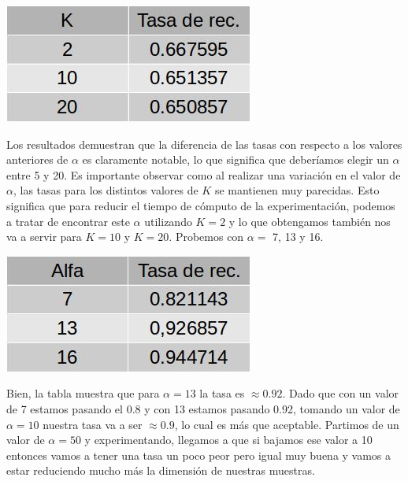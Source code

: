 \newline
\newline
\centerline{
\includegraphics[scale=0.4]{Tablas/alfa5.jpg}
}
\newline
\newline
Los resultados demuestran que la diferencia de las tasas con respecto a los valores anteriores de $\alpha$ es claramente notable, lo que significa que deberíamos elegir un $\alpha$ entre 5 y 20. Es importante observar como al realizar una variación en el valor de $\alpha$, las tasas para los distintos valores de $K$ se mantienen muy parecidas. Esto significa que para reducir el tiempo de cómputo de la experimentación, podemos a tratar de encontrar este $\alpha$ utilizando $K = 2$ y lo que obtengamos también nos va a servir para $K = 10$ y $K = 20$. Probemos con $\alpha = $ 7, 13 y 16.
\newline
\newline
\centerline{
\includegraphics[scale=0.4]{Tablas/variandoalfaschicos.jpg}
}
\newline
\newline
Bien, la tabla muestra que para $\alpha = 13$ la tasa es $\approx 0.92$. Dado que con un valor de 7 estamos pasando el 0.8 y con 13 estamos pasando 0.92, tomando un valor de $\alpha = 10$ nuestra tasa va a ser $\approx 0.9$, lo cual es más que aceptable. Partimos de un valor de $\alpha = 50$ y experimentando, llegamos a que si bajamos ese valor a 10 entonces vamos a tener una tasa un poco peor pero igual muy buena y vamos a estar reduciendo mucho más la dimensión de nuestras muestras.


